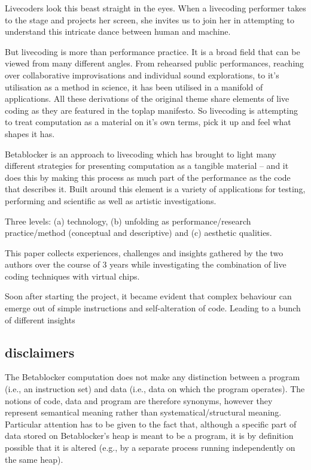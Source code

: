 \documentclass[letterpaper, 12pt]{article}
\begin{document}
Livecoders look this beast straight in the eyes. 
When a livecoding performer takes to the stage and projects her screen, she invites us to join her in attempting to understand this intricate dance between human and machine. 

But livecoding is more than performance practice.
It is a broad field that can be viewed from many different angles.
From rehearsed public performances, reaching over collaborative improvisations and individual sound explorations, to it's utilisation as a method in science, it has been utilised in a manifold of applications.
All these derivations of the original theme share elements of live coding as they are featured in the toplap manifesto.
So livecoding is attempting to treat computation as a material on it's own terms, pick it up and feel what shapes it has.

Betablocker is an approach to livecoding which has brought to light many different strategies for presenting computation as a tangible material -- and it does this by making this process as much part of the performance as the code that describes it.
Built around this element is a variety of applications for testing, performing and scientific as well as artistic investigations.

Three levels: (a) technology, (b) unfolding as performance/research practice/method (conceptual and descriptive) and (c) aesthetic qualities.


This paper collects experiences, challenges and insights gathered by the two authors over the course of 3 years while investigating the combination of live coding techniques with virtual chips.

Soon after starting the project, it became evident that complex behaviour can emerge out of simple instructions and self-alteration of code.
Leading to a bunch of different insights

\subsection{disclaimers}
\label{sub:disclaimers}

The Betablocker computation does not make any distinction between a program (i.e., an instruction set) and data (i.e., data on which the program operates). 
The notions of code, data and program are therefore synonyms, however they represent semantical meaning rather than systematical/structural meaning.
Particular attention has to be given to the fact that, although a specific part of data stored on Betablocker's heap is meant to be a program, it is by definition possible that it is altered (e.g., by a separate process running independently on the same heap).
\end{document}
